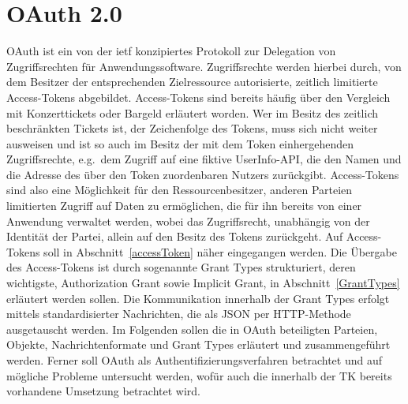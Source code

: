 \chapter{OAuth 2.0} \gls{OAuth} ist ein von der \gls{ietf} konzipiertes
Protokoll zur Delegation von Zugriffsrechten für Anwendungssoftware.
Zugriffsrechte werden hierbei durch, von dem Besitzer der entsprechenden
Zielressource autorisierte, zeitlich limitierte Access-Tokens abgebildet.
Access-Tokens sind bereits häufig über den Vergleich mit Konzerttickets oder
Bargeld erläutert worden. Wer im Besitz des zeitlich beschränkten Tickets ist,
der Zeichenfolge des Tokens, muss sich nicht weiter ausweisen und ist so auch im
Besitz der mit dem Token einhergehenden Zugriffsrechte, e.g.\ dem Zugriff auf
eine fiktive UserInfo-API, die den Namen und die Adresse des über den Token
zuordenbaren Nutzers zurückgibt. Access-Tokens sind also eine Möglichkeit für
den Ressourcenbesitzer, anderen Parteien limitierten Zugriff auf Daten zu
ermöglichen, die für ihn bereits von einer Anwendung verwaltet werden, wobei das
Zugriffsrecht, unabhängig von der Identität der Partei, allein auf den Besitz
des Tokens zurückgeht. Auf Access-Tokens soll in Abschnitt~\ref{accessToken}
näher eingegangen werden. Die Übergabe des Access-Tokens ist durch sogenannte
\glspl{Grant Type} strukturiert, deren wichtigste, Authorization Grant sowie
Implicit Grant, in Abschnitt~\ref{GrantTypes} erläutert werden sollen. Die
Kommunikation innerhalb der \glspl{Grant Type} erfolgt mittels standardisierter
Nachrichten, die als JSON per HTTP-Methode ausgetauscht werden. Im Folgenden
sollen die in \gls{OAuth} beteiligten Parteien, Objekte, Nachrichtenformate und
\glspl{Grant Type} erläutert und zusammengeführt werden. Ferner soll \gls{OAuth}
als Authentifizierungsverfahren betrachtet und auf mögliche Probleme untersucht
werden, wofür auch die innerhalb der TK bereits vorhandene Umsetzung betrachtet
wird.





